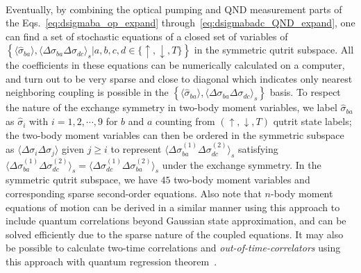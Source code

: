 \documentclass[aps,pra,twocolumn,superscriptaddress]{revtex4-1} %
\newcommand{\expect}[1]{\big\langle #1 \big\rangle}
\begin{document}
\begin{appendix}
\begin{align}
\end{align}
Eventually, by combining the optical pumping and QND measurement parts of the Eqs.~\eqref{eq:dsigmaba_op_expand} through~\eqref{eq:dsigmabadc_QND_expand}, one can find a set of stochastic equations of a closed set of variables of $ \left\{\expect{\hat{\sigma}_{ba}},\expect{\Delta\sigma_{ba}\Delta\sigma_{dc} }_s\left|a,b,c,d\in \{\uparrow,\downarrow,T \}\right. \right\} $ in the symmetric qutrit subspace. All the coefficients in these equations can be numerically calculated on a computer, and turn out to be very sparse and close to diagonal which indicates only nearest neighboring coupling is possible in the $\left\{\expect{\hat{\sigma}_{ba}},\expect{\Delta\sigma_{ba}\Delta\sigma_{dc} }_s\right\}$ basis. To respect the nature of the exchange symmetry in two-body moment variables, we label $ \hat{\sigma}_{ba} $ as $ \hat{\sigma}_i $ with $ i=1,2,\cdots, 9 $ for $ b$ and $a  $ counting from $ (\uparrow,\downarrow,T) $ qutrit state labels; the two-body moment variables can then be ordered in the symmetric subspace as $ \expect{\Delta\sigma_i\Delta\sigma_j} $ given $ j\ge i $ to represent $ \expect{\!\Delta \sigma_{ba}^{(\!1\!)}\! \Delta \sigma_{dc}^{(\!2\!)}}_s $ satisfying $ \expect{\!\Delta \sigma_{ba}^{(\!1\!)}\! \Delta \sigma_{dc}^{(\!2\!)}}_s=\expect{\!\Delta \sigma_{dc}^{(\!1\!)}\! \Delta \sigma_{ba}^{(\!2\!)}}_s $ under the exchange symmetry. In the symmetric qutrit subspace, we have $ 45 $ two-body moment variables and corresponding sparse second-order equations. Also note that $ n $-body moment equations of motion can be derived in a similar manner using this approach to include quantum correlations beyond Gaussian state approximation, and can be solved efficiently due to the sparse nature of the coupled equations. It may also be possible to calculate two-time correlations and \textit{out-of-time-correlators} using this approach with quantum regression theorem~\cite{Swingle2016Measuring,Swain1981Master}.


\end{appendix}
\end{document}
